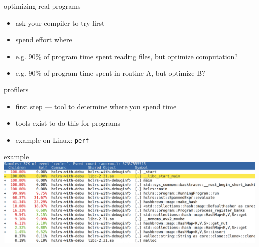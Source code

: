 \begin{frame}{optimizing real programs}
    \begin{itemize}
    \item ask your compiler to try first
    \vspace{.5cm}
    \item spend effort where 
    \item e.g. 90\% of program time spent reading files, but optimize computation?
    \item e.g. 90\% of program time spent in routine A, but optimize B?
    \end{itemize}
\end{frame}

\begin{frame}{profilers}
    \begin{itemize}
    \item first step --- tool to determine where you spend time
    \item tools exist to do this for programs
    \item example on Linux: \texttt{perf}
    \end{itemize}
\end{frame}

\begin{frame}{example}
\includegraphics[width=\textwidth]{../optimization/perf-screenshot}
\end{frame}
